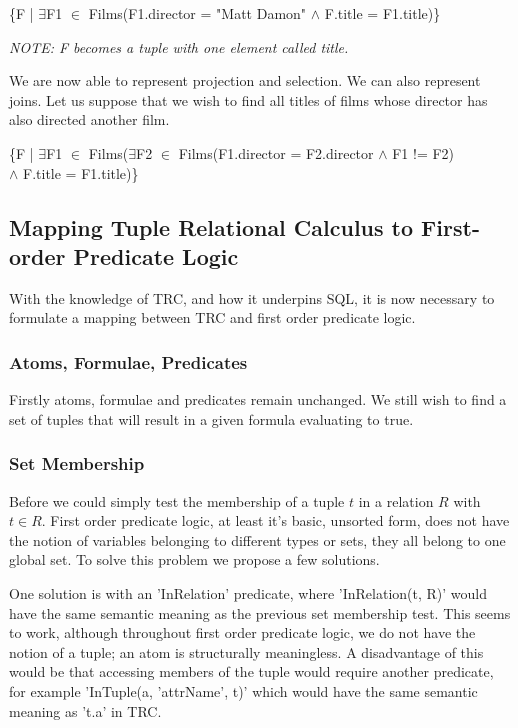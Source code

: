 \documentclass[a4paper, 11pt]{article}
\begin{document}
      \begin{center}
        \{F | $\exists$F1 $\in$ Films(F1.director = "Matt Damon" $\land$ 
          F.title = F1.title)\}
      
        \emph{NOTE: F becomes a tuple with one element called title.}
      \end{center}

      We are now able to represent projection and selection. We can also
      represent joins. Let us suppose that we wish to find all titles of films
      whose director has also directed another film.

      \begin{center}
        \{F | $\exists$F1 $\in$ Films($\exists$F2 $\in$ 
        Films(F1.director = F2.director $\land$ F1 != F2)
        \\ $\land$ F.title = F1.title)\}
      \end{center}

\subsection{Mapping Tuple Relational Calculus to First-order Predicate Logic}
    With the knowledge of TRC, and how it underpins SQL, it is now necessary to
    formulate a mapping between TRC and first order predicate logic.

    \subsubsection{Atoms, Formulae, Predicates}
      Firstly atoms, formulae and predicates remain unchanged. We still wish to
      find a set of tuples that will result in a given formula evaluating to
      true.

    \subsubsection{Set Membership}
      Before we could simply test the membership of a tuple $t$ in a
      relation $R$ with $t \in R$. First order predicate logic, at least it's basic,
      unsorted form, does not have the notion of variables belonging to
      different types or sets, they all belong to one global set. To solve
      this problem we propose a few solutions.

      One solution is with an 'InRelation' predicate, where 'InRelation(t, R)'
      would have the same semantic meaning as the previous set membership test.
      This seems to work, although throughout first order predicate logic, we
      do not have the notion of a tuple; an atom is structurally meaningless. A
      disadvantage of this would be that accessing members of the tuple would
      require another predicate, for example 'InTuple(a, 'attrName', t)' which
      would have the same semantic meaning as 't.a' in TRC.
\end{document}
